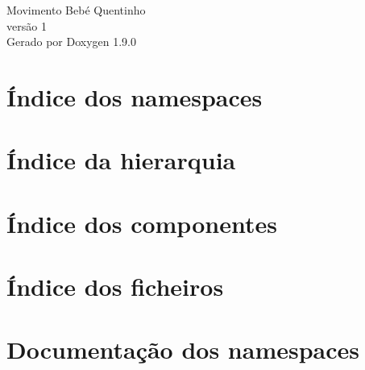\let\mypdfximage\pdfximage\def\pdfximage{\immediate\mypdfximage}\documentclass[twoside]{book}
\newcommand{\+}{\discretionary{\mbox{\scriptsize$\hookleftarrow$}}{}{}}
\newcommand{\clearemptydoublepage}{%
  \newpage{\pagestyle{empty}\cleardoublepage}%
}
\begin{document}
\raggedbottom

\hypersetup{pageanchor=false,
             bookmarksnumbered=true,
             pdfencoding=unicode
            }
\begin{titlepage}
\vspace*{7cm}
\begin{center}%
{\Large Movimento Bebé Quentinho \\[1ex]\large versão 1 }\\
\vspace*{1cm}
{\large Gerado por Doxygen 1.9.0}\\
\end{center}
\end{titlepage}
\clearemptydoublepage
{}
\tableofcontents
\clearemptydoublepage
{}
\hypersetup{pageanchor=true}

\chapter{Índice dos namespaces}

\chapter{Índice da hierarquia}

\chapter{Índice dos componentes}

\chapter{Índice dos ficheiros}

\chapter{Documentação dos namespaces}






\end{document}
